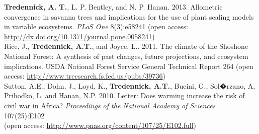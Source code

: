 \documentclass[margin,line]{resume}
\begin{document}
\begin{resume}
	\textbf{Tredennick, A. T.}, L. P. Bentley, and N. P. Hanan. 2013. Allometric convergence in savanna trees and implications for the use of plant scaling models in 	variable ecosystems. \textsl{PLoS One} 8(3):e58241 (open access: \href{http://dx.doi.org/10.1371/journal.pone.0058241}{http://dx.doi.org/10.1371/journal.pone.0058241})\vspace{-6mm}\\%

	Rice, J., \textbf{Tredennick, A.T.}, and Joyce, L.. 2011. The climate of the Shoshone National Forest: A synthesis of past changes, future projections, and 			ecosystem implications. USDA National Forest Service General Technical Report 264 (open access: \href{http://www.treesearch.fs.fed.us/pubs/39736}{http://www.treesearch.fs.fed.us/pubs/39736}) \vspace{-6mm}\\%
	
	Sutton, A.E., Dohn, J., Loyd, K., \textbf{Tredennick, A.T.}, Bucini, G., Sol�rzano, A, Prihodko, L. and Hanan, N.P. 2010. Letter: Does warming increase the risk of civil war 	in Africa? \textsl{Proceedings of the National Academy of Sciences} 107(25):E102 \\ (open access: \href{http://www.pnas.org/content/107/25/E102.full}{http://www.pnas.org/content/107/25/E102.full}) %
	

\end{resume}
\end{document}
